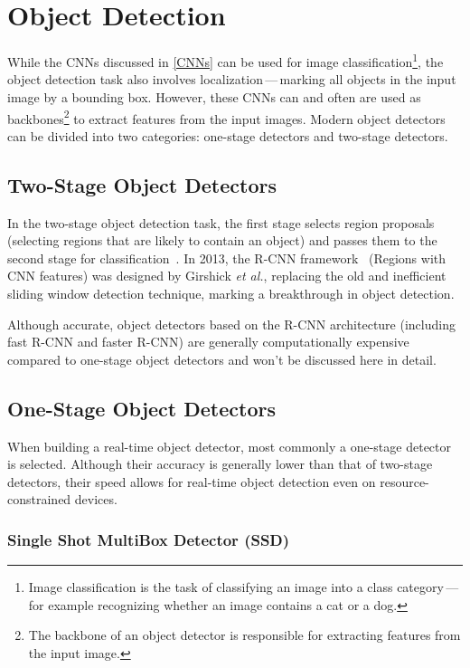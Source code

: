 \section{Object Detection}

While the CNNs discussed in \autoref{CNNs} can be used for image
classification\footnote{Image classification is the task of classifying an image
into a class category\,---\,for example recognizing whether an image contains a
cat or a dog.}, the object detection task also involves
localization\,---\,marking all objects in the input image by a bounding box.
However, these CNNs can and often are used as backbones\footnote{The backbone of an object detector is responsible for extracting
features from the input image.} to extract features from
the input images. Modern object detectors can be divided into two
categories: one-stage detectors and two-stage detectors.


\subsection{Two-Stage Object Detectors}

In the two-stage object detection task, the first stage selects region proposals
(selecting regions that are likely to contain an object) and passes them to the
second stage for classification~\cite{Li2022}. In 2013, the R-CNN
framework~\cite{Girshick2013} (Regions with CNN features) was designed by
Girshick \textit{et al.}, replacing the old and inefficient sliding window
detection technique, marking a breakthrough in object detection.

Although accurate, object detectors based on the R-CNN architecture (including
fast R-CNN and faster R-CNN) are generally computationally expensive compared to
one-stage object detectors and won't be discussed here in detail.


\subsection{One-Stage Object Detectors}

When building a real-time object detector, most commonly a one-stage detector is
selected. Although their accuracy is generally lower than that of two-stage
detectors, their speed allows for real-time object detection even on
resource-constrained devices.

\subsubsection{Single Shot MultiBox Detector (SSD)}

